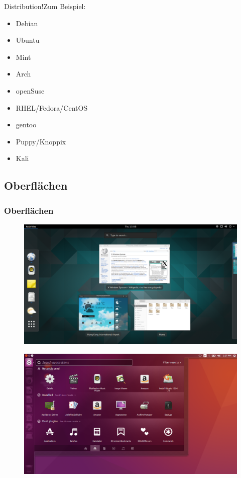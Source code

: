 \begin{frame}{Distribution!}{Zum Beispiel:}
\begin{itemize}%
\item Debian
\item Ubuntu
\item Mint
\item Arch
\item openSuse
\item RHEL/Fedora/CentOS 
\item gentoo
\item Puppy/Knoppix 
\item Kali 

\end{itemize}
\end{frame}

\subsection{Oberflächen}
\begin{frame}
\frametitle{Oberflächen}

\begin{figure}
 \includegraphics[height=0.7\textheight]{resources/1200px-GNOME_Shell.png}
 \end{figure}

\end{frame}
\begin{frame}

\begin{figure}
 \includegraphics[height=0.7\textheight]{resources/1200px-App_Lens_on_Ubuntu.png}
 \end{figure}
\end{frame}

